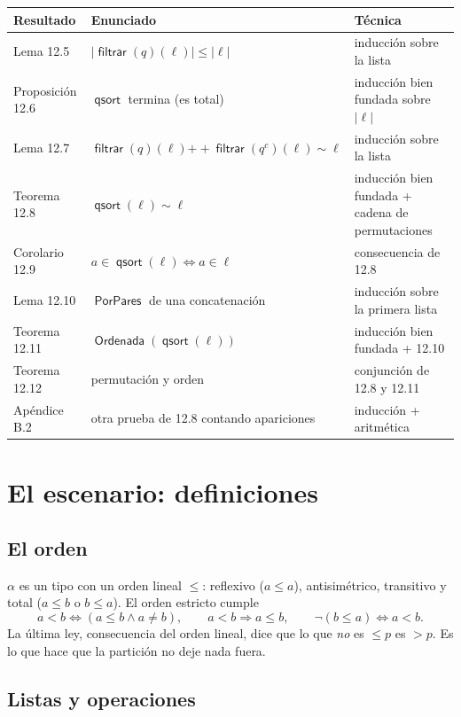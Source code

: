 \documentclass[11pt,a4paper]{article}
\newcommand{\Perm}{\sim}
\newcommand{\concat}{\mathbin{+\!\!+}}
\newcommand{\qs}{\operatorname{\mathsf{qsort}}}
\newcommand{\filt}{\operatorname{\mathsf{filtrar}}}
\newcommand{\len}[1]{\lvert #1\rvert}
\newcommand{\Sorted}{\operatorname{\mathsf{Ordenada}}}
\newcommand{\Pairwise}{\operatorname{\mathsf{PorPares}}}
\begin{document}
{\small
\begin{longtable}{@{}p{}p{}p{}@{}}
\toprule
\textbf{Resultado} & \textbf{Enunciado} & \textbf{Técnica}\\
\midrule
\endhead
Lema 12.5 & \(\len{\filt(q)(\ell)}\leq\len\ell\) & inducción sobre la lista\\
Proposición 12.6 & \(\qs\) termina (es total) & inducción bien fundada sobre \(\len\ell\)\\
Lema 12.7 & \(\filt(q)(\ell)\concat\filt(q^c)(\ell)\Perm\ell\) & inducción sobre la lista\\
Teorema 12.8 & \(\qs(\ell)\Perm\ell\) & inducción bien fundada + cadena de permutaciones\\
Corolario 12.9 & \(a\in\qs(\ell)\iff a\in\ell\) & consecuencia de 12.8\\
Lema 12.10 & \(\Pairwise\) de una concatenación & inducción sobre la primera lista\\
Teorema 12.11 & \(\Sorted(\qs(\ell))\) & inducción bien fundada + 12.10\\
Teorema 12.12 & permutación y orden & conjunción de 12.8 y 12.11\\
Apéndice B.2 & otra prueba de 12.8 contando apariciones & inducción + aritmética\\
\bottomrule
\end{longtable}
}

\section{El escenario: definiciones}

\subsection{El orden}

\(\alpha\) es un tipo con un orden lineal \(\leq\): reflexivo
(\(a\leq a\)), antisimétrico, transitivo y total
(\(a\leq b\) o \(b\leq a\)). El orden estricto cumple
\[
a<b\iff(a\leq b\wedge a\neq b),\qquad a<b\Rightarrow a\leq b,\qquad
\neg(b\leq a)\iff a<b .\tag{O}
\]
La última ley, consecuencia del orden lineal, dice que lo que \emph{no}
es \(\leq p\) es \(>p\). Es lo que hace que la partición no deje nada fuera.

\subsection{Listas y operaciones}
\end{document}

